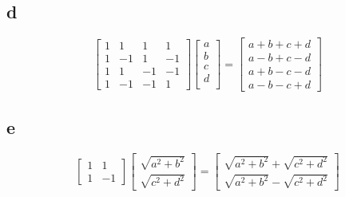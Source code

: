 \documentclass[letterpaper,notitlepage,twoside]{article}
\begin{document}
\subsection*{d}
\[
\begin{bmatrix}
1 &  1 &  1 &  1 \\
1 & -1 &  1 & -1 \\
1 &  1 & -1 & -1 \\
1 & -1 & -1 &  1 
\end{bmatrix}
\begin{bmatrix}
a \\
b \\
c \\
d \\
\end{bmatrix}
=
\begin{bmatrix}
a + b + c + d \\
a - b + c - d \\
a + b - c - d \\
a - b - c + d
\end{bmatrix}
\]
\subsection*{e}
\[
\begin{bmatrix}
1 &  1 \\
1 & -1
\end{bmatrix}
\begin{bmatrix}
\sqrt{a^2 + b^2} \\
\sqrt{c^2 + d^2}
\end{bmatrix}
=
\begin{bmatrix}
\sqrt{a^2 + b^2} + \sqrt{c^2 + d^2}\\
\sqrt{a^2 + b^2} - \sqrt{c^2 + d^2}
\end{bmatrix}
\]
\end{document}
